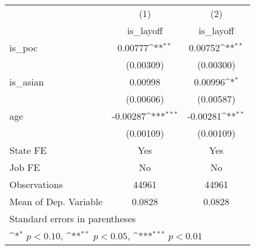 {
\def\sym#1{\ifmmode^{#1}\else\(^{#1}\)\fi}
\begin{tabular}{l*{2}{c}}
\hline\hline
                    &\multicolumn{1}{c}{(1)}&\multicolumn{1}{c}{(2)}\\
                    &\multicolumn{1}{c}{is\_layoff}&\multicolumn{1}{c}{is\_layoff}\\
\hline
is\_poc              &     0.00777\sym{**} &     0.00752\sym{**} \\
                    &   (0.00309)         &   (0.00300)         \\
[1em]
is\_asian            &     0.00998         &     0.00996\sym{*}  \\
                    &   (0.00606)         &   (0.00587)         \\
[1em]
age                 &    -0.00287\sym{***}&    -0.00281\sym{**} \\
                    &   (0.00109)         &   (0.00109)         \\
\hline
State FE            &         Yes         &         Yes         \\
Job FE              &          No         &          No         \\
Observations        &       44961         &       44961         \\
Mean of Dep. Variable&      0.0828         &      0.0828         \\
\hline\hline
\multicolumn{3}{l}{\footnotesize Standard errors in parentheses}\\
\multicolumn{3}{l}{\footnotesize \sym{*} \(p<0.10\), \sym{**} \(p<0.05\), \sym{***} \(p<0.01\)}\\
\end{tabular}
}

